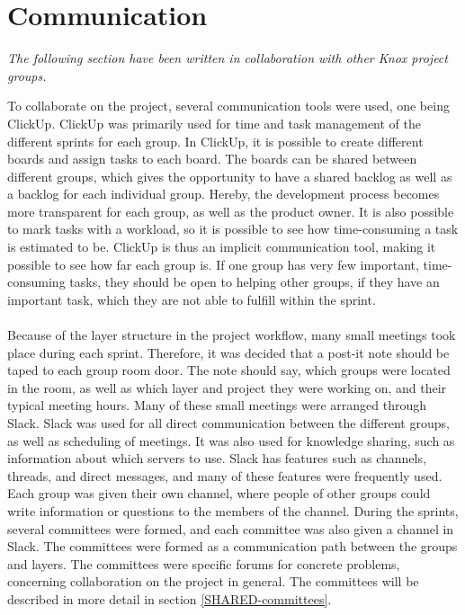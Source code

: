 \section{Communication}\label{communication_in_knox}
\textit{The following section have been written in collaboration with other Knox project groups.}


To collaborate on the project, several communication tools were used, one being ClickUp\cite{clickup}. ClickUp was primarily used for time and task management of the different sprints for each group. In ClickUp, it is possible to create different boards and assign tasks to each board. The boards can be shared between different groups, which gives the opportunity to have a shared backlog as well as a backlog for each individual group. Hereby, the development process becomes more transparent for each group, as well as the product owner. It is also possible to mark tasks with a workload, so it is possible to see how time-consuming a task is estimated to be. ClickUp is thus an implicit communication tool, making it possible to see how far each group is. If one group has very few important, time-consuming tasks, they should be open to helping other groups, if they have an important task, which they are not able to fulfill within the sprint.
\\\\
Because of the layer structure in the project workflow, many small meetings took place during each sprint. Therefore, it was decided that a post-it note should be taped to each group room door. The note should say, which groups were located in the room, as well as which layer and project they were working on, and their typical meeting hours. 
Many of these small meetings were arranged through Slack\cite{slack}. Slack was used for all direct communication between the different groups, as well as scheduling of meetings. It was also used for knowledge sharing, such as information about which servers to use. Slack has features such as channels, threads, and direct messages, and many of these features were frequently used. Each group was given their own channel, where people of other groups could write information or questions to the members of the channel. During the sprints, several committees were formed, and each committee was also given a channel in Slack. The committees were formed as a communication path between the groups and layers. The committees were specific forums for concrete problems, concerning collaboration on the project in general. The committees will be described in more detail in section \ref{SHARED-committees}.
